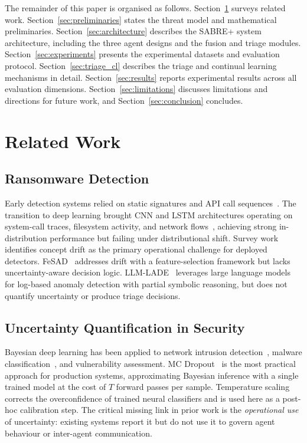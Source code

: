 \documentclass[journal]{IEEEtran}
\begin{document}
The remainder of this paper is organised as follows.
Section~\ref{sec:related} surveys related work.
Section~\ref{sec:preliminaries} states the threat model and mathematical
preliminaries.
Section~\ref{sec:architecture} describes the SABRE+ system architecture,
including the three agent designs and the fusion and triage modules.
Section~\ref{sec:experiments} presents the experimental datasets and
evaluation protocol.
Section~\ref{sec:triage_cl} describes the triage and continual learning
mechanisms in detail.
Section~\ref{sec:results} reports experimental results across all evaluation
dimensions.
Section~\ref{sec:limitations} discusses limitations and directions for future
work, and Section~\ref{sec:conclusion} concludes.

\section{Related Work}
\label{sec:related}

\subsection{Ransomware Detection}
Early detection systems relied on static signatures and
API call sequences~\cite{fernando2020study}.
The transition to deep learning brought CNN and LSTM architectures
operating on system-call traces, filesystem activity, and network
flows~\cite{zahoora2022Deep,alraizza2023ransomware}, achieving strong
in-distribution performance but failing under distributional shift.
Survey work~\cite{razaulla2023age} identifies concept drift as the
primary operational challenge for deployed detectors.
FeSAD~\cite{Fernando2024FeSAD} addresses drift with a feature-selection
framework but lacks uncertainty-aware decision logic.
LLM-LADE~\cite{ZhangLZYHY25} leverages large language models for
log-based anomaly detection with partial symbolic reasoning, but
does not quantify uncertainty or produce triage decisions.

\subsection{Uncertainty Quantification in Security}
Bayesian deep learning has been applied to network intrusion
detection~\cite{Doan2024uncertainBay}, malware
classification~\cite{kabuye2025explainable}, and vulnerability
assessment.
MC Dropout~\cite{gal2016dropout} is the most practical approach for
production systems, approximating Bayesian inference with a single
trained model at the cost of $T$ forward passes per sample.
Temperature scaling~\cite{guo2017calibration} corrects the
overconfidence of trained neural classifiers and is used here as a
post-hoc calibration step.
The critical missing link in prior work is the
\emph{operational use} of uncertainty: existing systems report it but
do not use it to govern agent behaviour or inter-agent communication.
\end{document}
